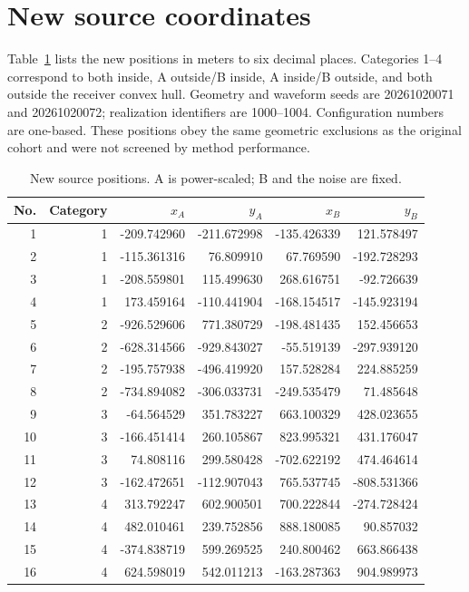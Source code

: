 \documentclass[a4paper,fleqn,review]{cas-sc}
\begin{document}
\section{New source coordinates}\label{en:coordinates}
Table~\ref{en:coordinates-table} lists the new positions in meters to six decimal places. Categories 1--4 correspond to both inside, A outside/B inside, A inside/B outside, and both outside the receiver convex hull. Geometry and waveform seeds are 20261020071 and 20261020072; realization identifiers are 1000--1004. Configuration numbers are one-based. These positions obey the same geometric exclusions as the original cohort and were not screened by method performance.
\begin{table}[pos=H]\centering
\caption{New source positions. A is power-scaled; B and the noise are fixed.}\label{en:coordinates-table}
\begin{tabular}{@{}rrrrrr@{}}\toprule
No. & Category & $x_A$ & $y_A$ & $x_B$ & $y_B$\\\midrule
1 & 1 & -209.742960 & -211.672998 & -135.426339 & 121.578497\\
2 & 1 & -115.361316 & 76.809910 & 67.769590 & -192.728293\\
3 & 1 & -208.559801 & 115.499630 & 268.616751 & -92.726639\\
4 & 1 & 173.459164 & -110.441904 & -168.154517 & -145.923194\\
5 & 2 & -926.529606 & 771.380729 & -198.481435 & 152.456653\\
6 & 2 & -628.314566 & -929.843027 & -55.519139 & -297.939120\\
7 & 2 & -195.757938 & -496.419920 & 157.528284 & 224.885259\\
8 & 2 & -734.894082 & -306.033731 & -249.535479 & 71.485648\\
9 & 3 & -64.564529 & 351.783227 & 663.100329 & 428.023655\\
10 & 3 & -166.451414 & 260.105867 & 823.995321 & 431.176047\\
11 & 3 & 74.808116 & 299.580428 & -702.622192 & 474.464614\\
12 & 3 & -162.472651 & -112.907043 & 765.537745 & -808.531366\\
13 & 4 & 313.792247 & 602.900501 & 700.222844 & -274.728424\\
14 & 4 & 482.010461 & 239.752856 & 888.180085 & 90.857032\\
15 & 4 & -374.838719 & 599.269525 & 240.800462 & 663.866438\\
16 & 4 & 624.598019 & 542.011213 & -163.287363 & 904.989973\\\bottomrule
\end{tabular}\end{table}
\FloatBarrier


\end{document}
